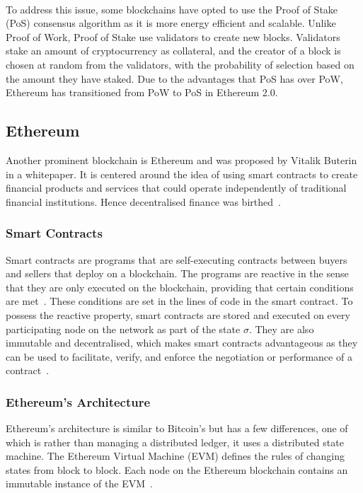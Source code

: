 \\[3mm]
To address this issue, some blockchains have opted to use the Proof of Stake (PoS) consensus algorithm as it is more energy efficient and scalable. Unlike Proof of Work, Proof of Stake use validators to create new blocks. Validators stake an amount of cryptocurrency as collateral, and the creator of a block is chosen at random from the validators, with the probability of selection based on the amount they have staked. Due to the advantages that PoS has over PoW, Ethereum has transitioned from PoW to PoS in Ethereum 2.0.

\subsection{Ethereum}
Another prominent blockchain is Ethereum and was proposed by Vitalik Buterin in a whitepaper. It is centered around the idea of using smart contracts to create financial products and services that could operate independently of traditional financial institutions. Hence decentralised finance was birthed~\cite{buterin2014next}.

\subsubsection{Smart Contracts}
Smart contracts are programs that are self-executing contracts between buyers and sellers that deploy on a blockchain. The programs are reactive in the sense that they are only executed on the blockchain, providing that certain conditions are met~\cite{noauthor_what_nodate}. These conditions are set in the lines of code in the smart contract. To possess the reactive property, smart contracts are stored and executed on every participating node on the network as part of the state $\sigma$. They are also immutable and decentralised, which makes smart contracts advantageous as they can be used to facilitate, verify, and enforce the negotiation or performance of a contract~\cite{noauthor_introduction_nodate, noauthor_smart_nodate}.

\subsubsection{Ethereum's Architecture}
Ethereum's architecture is similar to Bitcoin's but has a few differences, one of which is rather than managing a distributed ledger, it uses a distributed state machine. The Ethereum Virtual Machine (EVM) defines the rules of changing states from block to block. Each node on the Ethereum blockchain contains an immutable instance of the EVM~\cite{noauthor_ethereum_nodate}.

